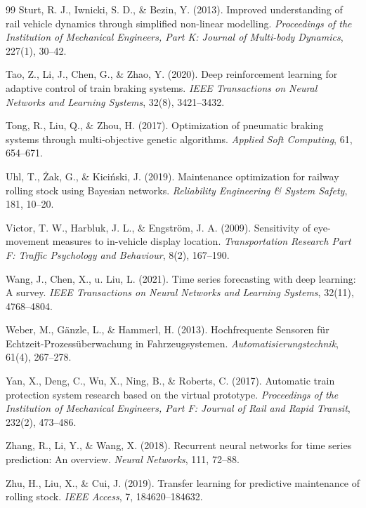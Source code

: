 \documentclass[a4paper,12pt]{article}
\theoremstyle{definition}
\theoremstyle{remark}
\begin{document}
\begin{thebibliography}{99}
 Sturt, R. J., Iwnicki, S. D., \& Bezin, Y. (2013). Improved understanding of rail vehicle dynamics through simplified non-linear modelling. \textit{Proceedings of the Institution of Mechanical Engineers, Part K: Journal of Multi-body Dynamics}, 227(1), 30--42.

 Tao, Z., Li, J., Chen, G., \& Zhao, Y. (2020). Deep reinforcement learning for adaptive control of train braking systems. \textit{IEEE Transactions on Neural Networks and Learning Systems}, 32(8), 3421--3432.

 Tong, R., Liu, Q., \& Zhou, H. (2017). Optimization of pneumatic braking systems through multi-objective genetic algorithms. \textit{Applied Soft Computing}, 61, 654--671.

 Uhl, T., Żak, G., \& Kiciński, J. (2019). Maintenance optimization for railway rolling stock using Bayesian networks. \textit{Reliability Engineering \& System Safety}, 181, 10--20.

 Victor, T. W., Harbluk, J. L., \& Engström, J. A. (2009). Sensitivity of eye-movement measures to in-vehicle display location. \textit{Transportation Research Part F: Traffic Psychology and Behaviour}, 8(2), 167--190.

 Wang, J., Chen, X., u. Liu, L. (2021). Time series forecasting with deep learning: A survey. \textit{IEEE Transactions on Neural Networks and Learning Systems}, 32(11), 4768--4804.

 Weber, M., Gänzle, L., \& Hammerl, H. (2013). Hochfrequente Sensoren für Echtzeit-Prozessüberwachung in Fahrzeugsystemen. \textit{Automatisierungstechnik}, 61(4), 267--278.

 Yan, X., Deng, C., Wu, X., Ning, B., \& Roberts, C. (2017). Automatic train protection system research based on the virtual prototype. \textit{Proceedings of the Institution of Mechanical Engineers, Part F: Journal of Rail and Rapid Transit}, 232(2), 473--486.

 Zhang, R., Li, Y., \& Wang, X. (2018). Recurrent neural networks for time series prediction: An overview. \textit{Neural Networks}, 111, 72--88.

 Zhu, H., Liu, X., \& Cui, J. (2019). Transfer learning for predictive maintenance of rolling stock. \textit{IEEE Access}, 7, 184620--184632.

\end{thebibliography}
\end{document}
